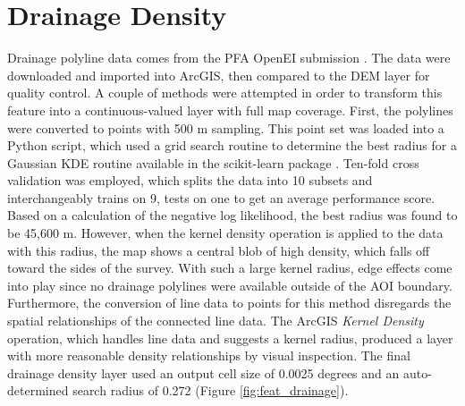 \section{Drainage Density}\label{app:dl_drainage_density}
Drainage polyline data comes from the \citet{bielicki_hydrogeolgic_2015} PFA OpenEI submission \citep{kelley_geothermal_2015}. The data were downloaded and imported into ArcGIS, then compared to the DEM layer for quality control. A couple of methods were attempted in order to transform this feature into a continuous-valued layer with full map coverage. First, the polylines were converted to points with 500 m sampling. This point set was loaded into a Python script, which used a grid search routine to determine the best radius for a Gaussian KDE routine available in the scikit-learn package \citep{pedregosa_scikit-learn_2011}. Ten-fold cross validation was employed, which splits the data into 10 subsets and interchangeably trains on 9, tests on one to get an average performance score. Based on a calculation of the negative log likelihood, the best radius was found to be 45,600 m. However, when the kernel density operation is applied to the data with this radius, the map shows a central blob of high density, which falls off toward the sides of the survey. With such a large kernel radius, edge effects come into play since no drainage polylines were available outside of the AOI boundary. Furthermore, the conversion of line data to points for this method disregards the spatial relationships of the connected line data. The ArcGIS \textit{Kernel Density} operation, which handles line data and suggests a kernel radius, produced a layer with more reasonable density relationships by visual inspection. The final drainage density layer used an output cell size of 0.0025 degrees and an auto-determined search radius of 0.272 (Figure \ref{fig:feat_drainage}).
\vfill
\pagebreak

